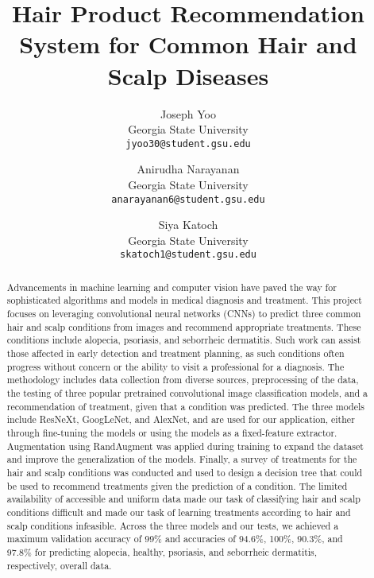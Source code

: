 \documentclass[10pt,twocolumn,letterpaper]{article}
\begin{document}
\title{Hair Product Recommendation System for Common Hair and Scalp Diseases}

\author{Joseph Yoo\\
Georgia State University\\
{\tt\small jyoo30@student.gsu.edu}
\and
Anirudha Narayanan\\
Georgia State University\\
{\tt\small anarayanan6@student.gsu.edu}
\and
Siya Katoch\\
Georgia State University\\
{\tt\small skatoch1@student.gsu.edu}
}


\maketitle

\begin{abstract}
Advancements in machine learning and computer vision have paved the way for sophisticated algorithms and models in medical diagnosis and treatment. This project focuses on leveraging convolutional neural networks (CNNs) to predict three common hair and scalp conditions from images and recommend appropriate treatments. These conditions include alopecia, psoriasis, and seborrheic dermatitis. Such work can assist those affected in early detection and treatment planning, as such conditions often progress without concern or the ability to visit a professional for a diagnosis. The methodology includes data collection from diverse sources, preprocessing of the data, the testing of three popular pretrained convolutional image classification models, and a recommendation of treatment, given that a condition was predicted. The three models include ResNeXt, GoogLeNet, and AlexNet, and are used for our application, either through fine-tuning the models or using the models as a fixed-feature extractor. Augmentation using RandAugment was applied during training to expand the dataset and improve the generalization of the models. Finally, a survey of treatments for the hair and scalp conditions was conducted and used to design a decision tree that could be used to recommend treatments given the prediction of a condition. The limited availability of accessible and uniform data made our task of classifying hair and scalp conditions difficult and made our task of learning treatments according to hair and scalp conditions infeasible. Across the three models and our tests, we achieved a maximum validation accuracy of 99\% and accuracies of 94.6\%, 100\%, 90.3\%, and 97.8\% for predicting alopecia, healthy, psoriasis, and seborrheic dermatitis, respectively, overall data.
\end{abstract}
\end{document}
